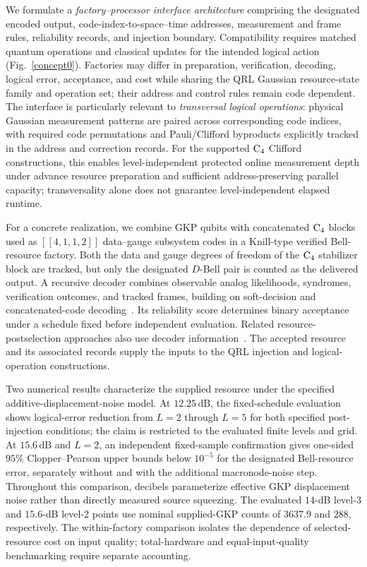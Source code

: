 \documentclass[aps,
prx,
superscriptaddress,
reprint,
longbibliography,
floatfix]{revtex4-2}
\begin{document}
We formulate a \emph{factory--processor interface architecture} comprising the designated encoded output, code-index-to-space--time addresses, measurement and frame rules, reliability records, and injection boundary. Compatibility requires matched quantum operations and classical updates for the intended logical action (Fig.~\ref{concept0}). Factories may differ in preparation, verification, decoding, logical error, acceptance, and cost while sharing the QRL Gaussian resource-state family and operation set; their address and control rules remain code dependent.
The interface is particularly relevant to \emph{transversal logical operations}: physical Gaussian measurement patterns are paired across corresponding code indices, with required code permutations and Pauli/Clifford byproducts explicitly tracked in the address and correction records. For the supported ${\rm C_4}$ Clifford constructions, this enables level-independent protected online measurement depth under advance resource preparation and sufficient address-preserving parallel capacity; transversality alone does not guarantee level-independent elapsed runtime.

For a concrete realization, we combine GKP qubits with concatenated ${\rm C_4}$ blocks used as $[[4,1,1,2]]$ data--gauge subsystem codes in a Knill-type verified Bell-resource factory. 
Both the data and gauge degrees of freedom of the ${\rm C_4}$ stabilizer block are tracked, but only the designated $D$-Bell pair is counted as the delivered output. A recursive decoder combines observable analog likelihoods, syndromes, verification outcomes, and tracked frames, building on soft-decision and concatenated-code decoding~\cite{GotoUchikawa2013Soft,Poulin2006Concatenated,Fukui2018Analog,walshe2020continuous}. Its reliability score determines binary acceptance under a schedule fixed before independent evaluation. Related resource-postselection approaches also use decoder information~\cite{Staples2026ScalablePostselection,Birchall2026Macromux}. 
The accepted resource and its associated records supply the inputs to the QRL injection and logical-operation constructions.

Two numerical results characterize the supplied resource under the specified additive-displacement-noise model. At $12.25\,\mathrm{dB}$, the fixed-schedule evaluation shows logical-error reduction from $L=2$ through $L=5$ for both specified post-injection conditions; the claim is restricted to the evaluated finite levels and grid. At $15.6\,\mathrm{dB}$ and $L=2$, an independent fixed-sample confirmation gives one-sided $95\%$ Clopper--Pearson upper bounds below $10^{-5}$ for the designated Bell-resource error, separately without and with the additional macronode-noise step. Throughout this comparison, decibels parameterize effective GKP displacement noise rather than directly measured source squeezing. The evaluated $14$-dB level-3 and $15.6$-dB level-2 points use nominal supplied-GKP counts of $3637.9$ and $288$, respectively. The within-factory comparison isolates the dependence of selected-resource cost on input quality; total-hardware and equal-input-quality benchmarking require separate accounting.
\end{document}
